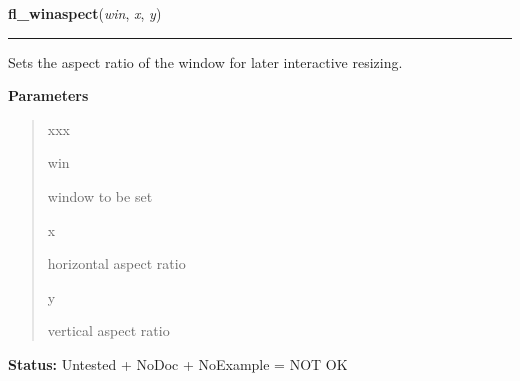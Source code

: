 \hspace{.8\funcindent}\begin{boxedminipage}{\funcwidth}

    \raggedright \textbf{fl\_winaspect}(\textit{win}, \textit{x}, \textit{y})

    \vspace{-1.5ex}

    \rule{\textwidth}{0.5\fboxrule}
\setlength{\parskip}{2ex}
    Sets the aspect ratio of the window for later interactive resizing.

\setlength{\parskip}{1ex}
      \textbf{Parameters}
      \vspace{-1ex}

      \begin{quote}
        \begin{Ventry}{xxx}

          \item[win]

          window to be set

          \item[x]

          horizontal aspect ratio

          \item[y]

          vertical aspect ratio

        \end{Ventry}

      \end{quote}

\textbf{Status:} Untested + NoDoc + NoExample = NOT OK



    \end{boxedminipage}

    \label{xformslib:library:fl_reset_winconstraints}

    \vspace{0.5ex}

